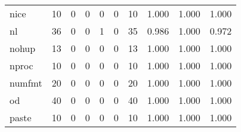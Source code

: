 \begin{longtable}{lp{2.0cm}p{2.0cm}p{2.0cm}p{2.0cm}p{2.0cm}p{2.0cm}p{2.0cm}p{2.0cm}p{2.0cm}}
nice      &                     10 &                                             0 &                                            0 &                                           0 &                                            0 &                                         10 &                                1.000 &                                  1.000 &                                1.000 \\
nl        &                     36 &                                             0 &                                            0 &                                           1 &                                            0 &                                         35 &                                0.986 &                                  1.000 &                                0.972 \\
nohup     &                     13 &                                             0 &                                            0 &                                           0 &                                            0 &                                         13 &                                1.000 &                                  1.000 &                                1.000 \\
nproc     &                     10 &                                             0 &                                            0 &                                           0 &                                            0 &                                         10 &                                1.000 &                                  1.000 &                                1.000 \\
numfmt    &                     20 &                                             0 &                                            0 &                                           0 &                                            0 &                                         20 &                                1.000 &                                  1.000 &                                1.000 \\
od        &                     40 &                                             0 &                                            0 &                                           0 &                                            0 &                                         40 &                                1.000 &                                  1.000 &                                1.000 \\
paste     &                     10 &                                             0 &                                            0 &                                           0 &                                            0 &                                         10 &                                1.000 &                                  1.000 &                                1.000 \\

\end{longtable}
